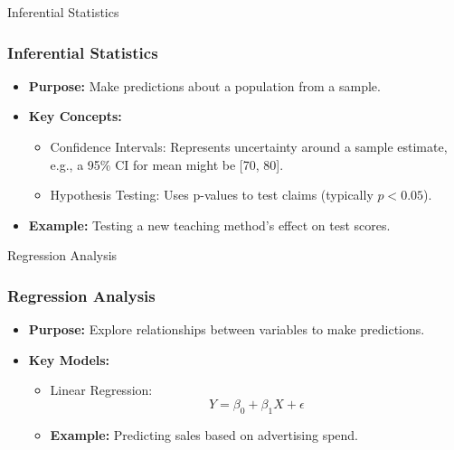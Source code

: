 \documentclass[aspectratio=169]{beamer}
\begin{document}
\begin{frame}{Inferential Statistics}
    \frametitle{Inferential Statistics}
    \begin{itemize}
        \item \textbf{Purpose:} Make predictions about a population from a sample.
        \item \textbf{Key Concepts:}
        \begin{itemize}
            \item Confidence Intervals: Represents uncertainty around a sample estimate, e.g., a 95\% CI for mean might be [70, 80].
            \item Hypothesis Testing: Uses p-values to test claims (typically \(p < 0.05\)).
        \end{itemize}
        \item \textbf{Example:} Testing a new teaching method's effect on test scores.
    \end{itemize}
\end{frame}

\begin{frame}{Regression Analysis}
    \frametitle{Regression Analysis}
    \begin{itemize}
        \item \textbf{Purpose:} Explore relationships between variables to make predictions.
        \item \textbf{Key Models:}
        \begin{itemize}
            \item Linear Regression: 
            \begin{equation}
                Y = \beta_0 + \beta_1X + \epsilon
            \end{equation}
            \item \textbf{Example:} Predicting sales based on advertising spend.
        \end{itemize}
    \end{itemize}
\end{frame}
\end{document}
